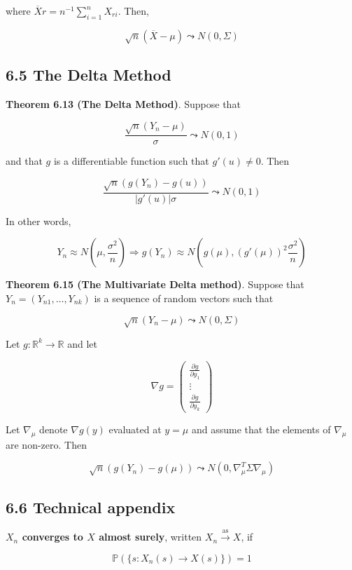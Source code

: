 where $\overline{X} r = n^{-1} \sum_{i=1}^{n} X_{ri}
$. Then,

\[ \sqrt{n} (\overline{X} - \mu) \leadsto N(0, \Sigma) \]

\subsection*{6.5 The Delta Method}\label{delta:method}

\textbf{Theorem 6.13 (The Delta Method)}. Suppose that

\[ \frac{\sqrt{n}(Y_{n} - \mu)}{\sigma} \leadsto N(0, 1)\]

and that \(g\) is a differentiable function such that \(g'(u) \neq 0\).
Then

\[ \frac{\sqrt{n}(g(Y_{n}) - g(u))}{|g'(u)| \sigma} \leadsto N(0, 1)\]

In other words,

\[ Y_{n} \approx N \left( \mu, \frac{\sigma^{2}}{n} \right) \Rightarrow g(Y_{n}) \approx N \left( g(\mu), (g'(\mu))^{2} \frac{\sigma^{2}}{n} \right) \]

\textbf{Theorem 6.15 (The Multivariate Delta method)}. Suppose that
\(Y_{n} = (Y_{n1}, \dots, Y_{nk})\) is a sequence of random vectors such
that

\[ \sqrt{n}(Y_{n} - \mu) \leadsto N(0, \Sigma) \]

Let \(g : \mathbb{R}^{k} \rightarrow \mathbb{R}\) and let

\[ \nabla g = \begin{pmatrix} \frac{\partial g}{\partial y_{1}} \\ \vdots \\  \frac{\partial g}{\partial y_{k}} \end{pmatrix} \]

Let \(\nabla_\mu\) denote \(\nabla g(y)\) evaluated at \(y = \mu\) and
assume that the elements of \(\nabla_\mu\) are non-zero. Then

\[ \sqrt{n}(g(Y_{n}) - g(\mu)) \leadsto N(0, \nabla_\mu^T \Sigma \nabla_\mu) \]

\subsection*{6.6 Technical appendix}

\textbf{\(X_{n}\) converges to \(X\) almost surely}, written
\(X_{n} \xrightarrow{\text{as}} X\), if

\[ \mathbb{P}(\{s : X_{n}(s) \rightarrow X(s)\}) = 1 \]

